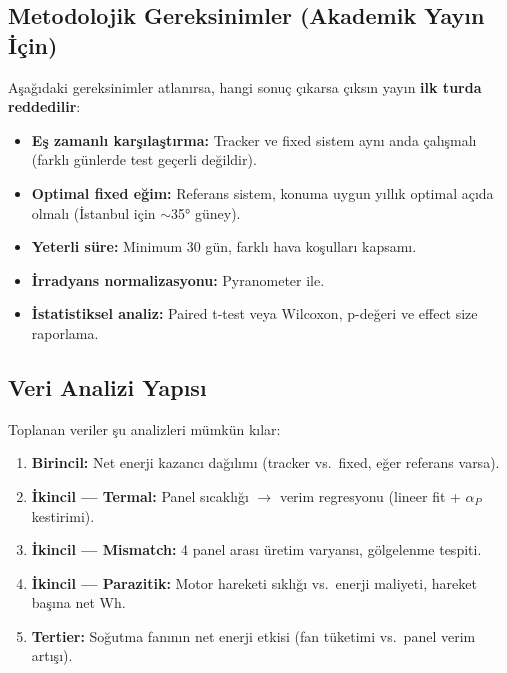 \documentclass[11pt,a4paper]{article}
\begin{document}
\subsection{Metodolojik Gereksinimler (Akademik Yayın İçin)}

\begin{dangerbox}
Aşağıdaki gereksinimler atlanırsa, hangi sonuç çıkarsa çıksın yayın \textbf{ilk turda reddedilir}:
\begin{itemize}
    \item \textbf{Eş zamanlı karşılaştırma:} Tracker ve fixed sistem aynı anda çalışmalı (farklı günlerde test geçerli değildir).
    \item \textbf{Optimal fixed eğim:} Referans sistem, konuma uygun yıllık optimal açıda olmalı (İstanbul için $\sim$35° güney).
    \item \textbf{Yeterli süre:} Minimum 30 gün, farklı hava koşulları kapsamı.
    \item \textbf{İrradyans normalizasyonu:} Pyranometer ile.
    \item \textbf{İstatistiksel analiz:} Paired t-test veya Wilcoxon, p-değeri ve effect size raporlama.
\end{itemize}
\end{dangerbox}

\subsection{Veri Analizi Yapısı}

Toplanan veriler şu analizleri mümkün kılar:

\begin{enumerate}
    \item \textbf{Birincil:} Net enerji kazancı dağılımı (tracker vs.\ fixed, eğer referans varsa).
    \item \textbf{İkincil --- Termal:} Panel sıcaklığı $\rightarrow$ verim regresyonu (lineer fit + $\alpha_P$ kestirimi).
    \item \textbf{İkincil --- Mismatch:} 4 panel arası üretim varyansı, gölgelenme tespiti.
    \item \textbf{İkincil --- Parazitik:} Motor hareketi sıklığı vs.\ enerji maliyeti, hareket başına net Wh.
    \item \textbf{Tertier:} Soğutma fanının net enerji etkisi (fan tüketimi vs.\ panel verim artışı).
\end{enumerate}

\end{document}
